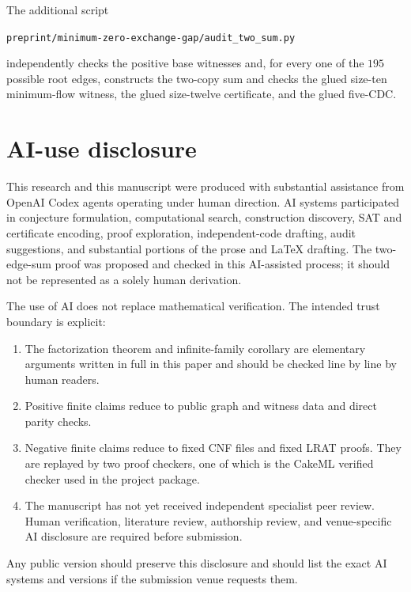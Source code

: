 \documentclass[11pt]{article}
\theoremstyle{definition}
\begin{document}
The additional script
\begin{center}
\texttt{preprint/minimum-zero-exchange-gap/audit\_two\_sum.py}
\end{center}
independently checks the positive base witnesses and, for every one of the
\(195\) possible root edges, constructs the two-copy sum and checks the
glued size-ten minimum-flow witness, the glued size-twelve certificate,
and the glued five-CDC.

\section{AI-use disclosure}
\label{sec:ai}

This research and this manuscript were produced with substantial
assistance from OpenAI Codex agents operating under human direction.  AI
systems participated in conjecture formulation, computational search,
construction discovery, SAT and certificate encoding, proof exploration,
independent-code drafting, audit suggestions, and substantial portions of
the prose and \LaTeX{} drafting.  The two-edge-sum proof was proposed and
checked in this AI-assisted process; it should not be represented as a
solely human derivation.

The use of AI does not replace mathematical verification.  The intended
trust boundary is explicit:
\begin{enumerate}
\item The factorization theorem and infinite-family corollary are
elementary arguments written in full in this paper and should be checked
line by line by human readers.
\item Positive finite claims reduce to public graph and witness data and
direct parity checks.
\item Negative finite claims reduce to fixed CNF files and fixed LRAT
proofs.  They are replayed by two proof checkers, one of which is the
CakeML verified checker used in the project package.
\item The manuscript has not yet received independent specialist peer
review.  Human verification, literature review, authorship review, and
venue-specific AI disclosure are required before submission.
\end{enumerate}
Any public version should preserve this disclosure and should list the
exact AI systems and versions if the submission venue requests them.
\end{document}
